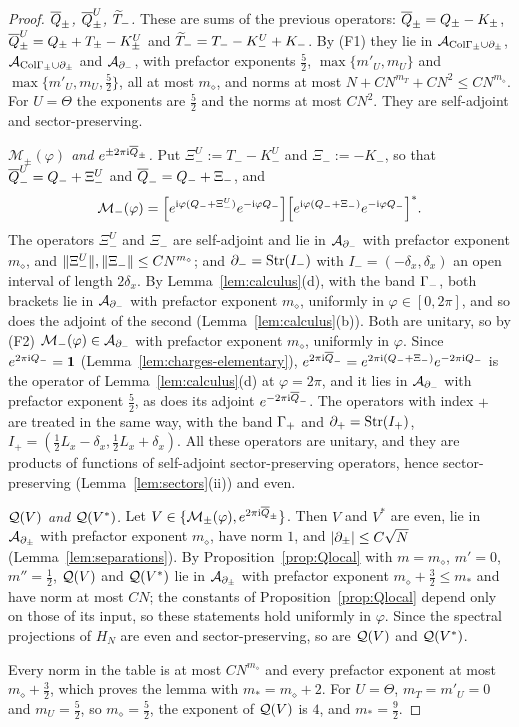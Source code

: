 \begin{proof}
\emph{$\overline{Q}_\pm$, $\overline{Q}^U_\pm$, $\widetilde{T}_{-}$.} These are sums of the previous operators: $\overline{Q}_\pm=Q_\pm-K_\pm$,
$\overline{Q}^U_\pm=Q_\pm+T_\pm-K^U_\pm$ and $\widetilde{T}_{-}=T_--K^U_-+K_-$. By (F1) they lie in $\mathcal{A}_{\mathrm{Col}\Gamma_\pm\cup\partial_\pm}$,
$\mathcal{A}_{\mathrm{Col}\Gamma_\pm\cup\partial_\pm}$ and $\mathcal{A}_{\partial_{-}}$, with prefactor exponents $\frac52$, $\max\{m'_U,m_U\}$ and
$\max\{m'_U,m_U,\frac52\}$, all at most $m_\diamond$, and norms at most $N+CN^{m_T}+CN^2\le CN^{m_\diamond}$. For $U=\Theta$ the
exponents are $\frac52$ and the norms at most $CN^2$. They are self-adjoint and sector-preserving.

\emph{$\mathcal M_\pm(\varphi)$ and $e^{\pm2\pi\mathrm{i}\overline{Q}_\pm}$.} Put $\Xi^U_-:=T_--K^U_-$ and $\Xi_-:=-K_-$, so that $\overline{Q}^U_-=Q_-+\Xi^U_-$ and
$\overline{Q}_-=Q_-+\Xi_-$, and
\[
\mathcal M_-(\varphi)=\Bigl[e^{\mathrm{i}\varphi(Q_-+\Xi^U_-)}e^{-\mathrm{i}\varphi Q_-}\Bigr]\Bigl[e^{\mathrm{i}\varphi(Q_-+\Xi_-)}e^{-\mathrm{i}\varphi Q_-}\Bigr]^* .
\]
The operators $\Xi^U_-$ and $\Xi_-$ are self-adjoint and lie in $\mathcal{A}_{\partial_{-}}$ with prefactor exponent $m_\diamond$, and
$\lVert\Xi^U_-\rVert,\lVert\Xi_-\rVert\le CN^{m_\diamond}$; and $\partial_{-}=\mathrm{Str}(I_-)$ with $I_-=(-\delta_x,\delta_x)$ an open interval of length
$2\delta_x$. By Lemma~\ref{lem:calculus}(d), with the band $\Gamma_{-}$, both brackets lie in $\mathcal{A}_{\partial_{-}}$ with prefactor exponent
$m_\diamond$, uniformly in $\varphi\in[0,2\pi]$, and so does the adjoint of the second (Lemma~\ref{lem:calculus}(b)). Both
are unitary, so by (F2) $\mathcal M_-(\varphi)\in\mathcal{A}_{\partial_{-}}$ with prefactor exponent $m_\diamond$, uniformly in $\varphi$. Since
$e^{2\pi\mathrm{i} Q_-}=\mathbf{1}$ (Lemma~\ref{lem:charges-elementary}),
$e^{2\pi\mathrm{i}\overline{Q}_-}=e^{2\pi\mathrm{i}(Q_-+\Xi_-)}e^{-2\pi\mathrm{i} Q_-}$ is the operator of Lemma~\ref{lem:calculus}(d) at $\varphi=2\pi$, and it
lies in $\mathcal{A}_{\partial_{-}}$ with prefactor exponent $\frac52$, as does its adjoint $e^{-2\pi\mathrm{i}\overline{Q}_-}$. The operators with index
$+$ are treated in the same way, with the band $\Gamma_{+}$ and $\partial_{+}=\mathrm{Str}(I_+)$, $I_+=(\frac12L_x-\delta_x,\frac12L_x+\delta_x)$.
All these operators are unitary, and they are products of functions of self-adjoint sector-preserving operators,
hence sector-preserving (Lemma~\ref{lem:sectors}(ii)) and even.

\emph{$\mathcal{Q}(V)$ and $\mathcal{Q}(V^*)$.} Let $V\in\{\mathcal M_\pm(\varphi),e^{2\pi\mathrm{i}\overline{Q}_\pm}\}$. Then $V$ and $V^*$ are even, lie in
$\mathcal{A}_{\partial_\pm}$ with prefactor exponent $m_\diamond$, have norm $1$, and $\lvert\partial_\pm\rvert\le C\sqrt N$
(Lemma~\ref{lem:separations}). By Proposition~\ref{prop:Qlocal} with $m=m_\diamond$, $m'=0$, $m''=\frac12$, $\mathcal{Q}(V)$ and
$\mathcal{Q}(V^*)$ lie in $\mathcal{A}_{\partial_\pm}$ with prefactor exponent $m_\diamond+\frac32\le m_*$ and have norm at most $CN$; the
constants of Proposition~\ref{prop:Qlocal} depend only on those of its input, so these statements hold uniformly in
$\varphi$. Since the spectral projections of $H_N$ are even and sector-preserving, so are $\mathcal{Q}(V)$ and $\mathcal{Q}(V^*)$.

Every norm in the table is at most $CN^{m_\diamond}$ and every prefactor exponent at most $m_\diamond+\frac32$, which proves
the lemma with $m_*=m_\diamond+2$. For $U=\Theta$, $m_T=m'_U=0$ and $m_U=\frac52$, so $m_\diamond=\frac52$, the exponent of
$\mathcal{Q}(V)$ is $4$, and $m_*=\frac92$.
\end{proof}


